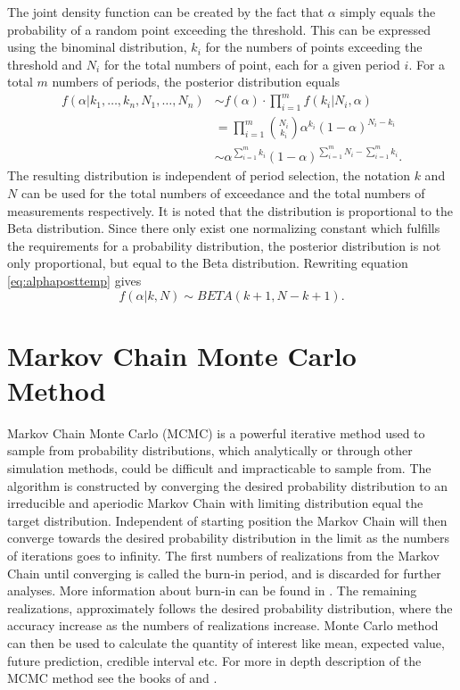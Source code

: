 The joint density function can be created by the fact that $\alpha$ simply equals the probability of a random point exceeding the threshold. This can be expressed using the binominal distribution, $k_i$ for the numbers of points exceeding the threshold and $N_i$ for the total numbers of point, each for a given period $i$. For a total $m$ numbers of periods, the posterior distribution equals
\begin{align}
f(\alpha|k_1,\dotsc,k_n, N_1, \dotsc, N_n)&\sim f(\alpha)\cdot \prod_{i=1}^{m} f(k_i|N_i,\alpha)\nonumber\\
&=\prod_{i=1}^{m} \binom{N_i}{k_i} \alpha^{k_i}(1-\alpha)^{N_i-k_i}\nonumber\\
& \sim \alpha^{\sum_{i=1}^{m}k_i}(1-\alpha)^{\sum_{i=1}^{m}N_i-\sum_{i=1}^{m}k_i}.\label{eq:alphaposttemp}
\end{align}
The resulting distribution is independent of period selection, the notation $k$ and $N$ can be used for the total numbers of exceedance and the total numbers of measurements respectively. It is noted that the distribution is proportional to the Beta distribution. Since there only exist one normalizing constant which fulfills the requirements for a probability distribution, the posterior distribution is not only proportional, but equal to the Beta distribution. Rewriting equation \eqref{eq:alphaposttemp} gives
\begin{equation}
\label{eq:alphapost}
f(\alpha|k,N) \sim BETA(k+1,N-k+1).
\end{equation}

\section{Markov Chain Monte Carlo Method}
\label{ch:mcmc}
Markov Chain Monte Carlo (MCMC) is a powerful iterative method used to sample from probability distributions, which analytically or through other simulation methods, could be difficult and impracticable to sample from. The algorithm is constructed by converging the desired probability distribution to an irreducible and aperiodic Markov Chain with limiting distribution equal the target distribution. Independent of starting position the Markov Chain will then converge towards the desired probability distribution in the limit as the numbers of iterations goes to infinity. The first numbers of realizations from the Markov Chain until converging is called the burn-in period, and is discarded for further analyses. More information about burn-in can be found in \cite[p.220]{compstat}. The remaining realizations, approximately follows the desired probability distribution, where the accuracy increase as the numbers of realizations increase. Monte Carlo method can then be used to calculate the quantity of interest like mean, expected value, future prediction, credible interval etc. For more in depth description of the MCMC method see the books of \cite{MCMC} and \cite[Chapter~7,8]{compstat}.

